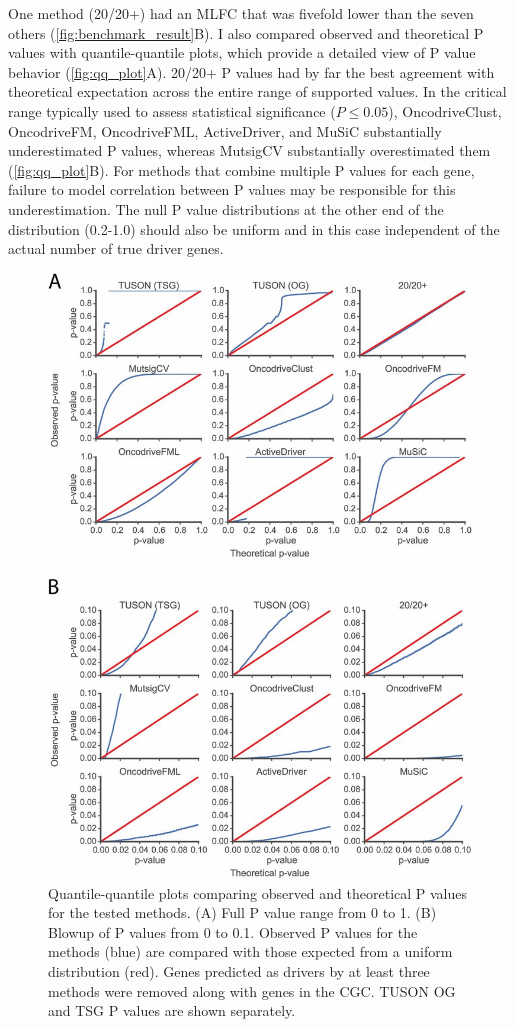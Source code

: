 One method (20/20+) had an MLFC that was fivefold lower than the seven others (\autoref{fig:benchmark_result}B). I also compared observed and theoretical P values with quantile-quantile plots, which provide a detailed view of P value behavior (\autoref{fig:qq_plot}A). 20/20+ P values had by far the best agreement with theoretical expectation across the entire range of supported values. In the critical range typically used to assess statistical significance ($P \leq 0.05$), OncodriveClust, OncodriveFM, OncodriveFML, ActiveDriver, and MuSiC substantially underestimated P values, whereas MutsigCV substantially overestimated them (\autoref{fig:qq_plot}B). For methods that combine multiple P values for each gene, failure to model correlation between P values may be responsible for this underestimation. The null P value distributions at the other end of the distribution (0.2-1.0) should also be uniform and in this case independent of the actual number of true driver genes.

\begin{figure}
  \centering
  \makeatletter
  \let\@currsize\normalsize
  \includegraphics[width=0.9\linewidth]{figures/chapter4/qq_plots.jpg}
  \caption[Quantile-quantile plots comparing observed and theoretical P values]{Quantile-quantile plots comparing observed and theoretical P values for the tested methods. (A) Full P value range from 0 to 1. (B) Blowup of P values from 0 to 0.1. Observed P values for the methods (blue) are compared with those expected from a uniform distribution (red). Genes predicted as drivers by at least three methods were removed along with genes in the CGC. TUSON OG and TSG P values are shown separately.}
  \label{fig:qq_plot}
\end{figure}

